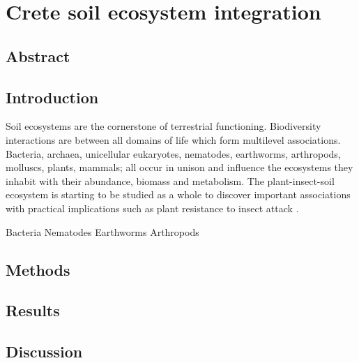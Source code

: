 % 
% 


\chapter{Crete soil ecosystem integration}
\label{cha:crete-soil}


%



\section{Abstract}

\section{Introduction}
\label{sec:crete-soil-intro}

Soil ecosystems are the cornerstone of terrestrial functioning.
Biodiversity interactions are between all domains of life which form
multilevel associations. Bacteria, archaea, unicellular eukaryotes, nematodes,
earthworms, arthropods, molluscs, plants, mammals; all occur in unison and 
influence the ecosystems they inhabit with their abundance, biomass \citep{bar2018biomass} and metabolism.
The plant-insect-soil ecosystem is starting to be studied as a whole to discover
important associations with practical implications such as plant resistance 
to insect attack \citep{plant-insect-soil2023}.


Bacteria \citep{Delgado-Baquerizo-atlas}
Nematodes \citep{vandenHoogen2019}
Earthworms \citep{Phillips2021}
Arthropods \citep{milo-arthropods}



\section{Methods}
\label{sec:crete-soil-method}

\section{Results}
\label{sec:crete-soil-results}

\section{Discussion}
\label{sec:crete-soil-discussion}

% 
